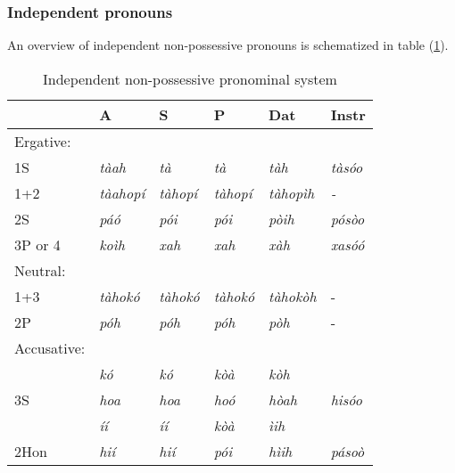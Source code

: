\documentclass[a4paper, 12pt, oneside]{memoir}
\begin{document}
\subsubsection{Independent pronouns}
An overview of independent non-possessive pronouns is schematized in table (\ref{t:indeppron}).
\begin{table}[H]
\begin{centering}
    \begin{tabular}{@{}llllll@{}}
    \toprule
    \multicolumn{1}{c}{} & A                    & S                    & P                    & Dat              & Instr                  \\ \midrule
    Ergative:            & \multicolumn{1}{c}{} & \multicolumn{1}{c}{} & \multicolumn{1}{c}{} &                  & \multicolumn{1}{c}{}   \\
    1S                   & \textit{tàah}        & \textit{tà}          & \textit{tà}          & \textit{tàh}     & \textit{tàsóo}         \\
    1+2                  & \textit{tàahopí}     & \textit{tàhopí}      & \textit{tàhopí}      & \textit{tàhopìh} & \textit{-}             \\
    2S                   & \textit{páó}         & \textit{pói}         & \textit{pói}         & \textit{pòih}    & \textit{pósòo}         \\
    3P or 4              & \textit{koìh}        & \textit{xah}         & \textit{xah}         & \textit{xàh}     & \textit{xasóó}         \\
    Neutral:             &                      &                      &                      &                  &                        \\
    1+3                  & \textit{tàhokó}      & \textit{tàhokó}      & \textit{tàhokó}      & \textit{tàhokòh} & -                      \\
    2P                   & \textit{póh}         & \textit{póh}         & \textit{póh}         & \textit{pòh}     & -                      \\
    Accusative:          &                      &                      &                      &                  &                        \\
                         & \textit{kó}          & \textit{kó}          & \textit{kòà}         & \textit{kòh}     &                        \\
                      3S & \textit{hoa}         & \textit{hoa}         & \textit{hoó}         & \textit{hòah}    & \textit{hisóo}                  \\
                         & \textit{íí}          & \textit{íí}          & \textit{kòà}         & \textit{ìih}     &                        \\
    2Hon                 & \textit{hií}         & \textit{hií}         & \textit{pói}         & \textit{hìih}    & \textit{pásoò}         \\ \bottomrule
    \end{tabular}
    \caption{Independent non-possessive pronominal system
    }
    \label{t:indeppron}
\end{centering}
\end{table}
\end{document}
